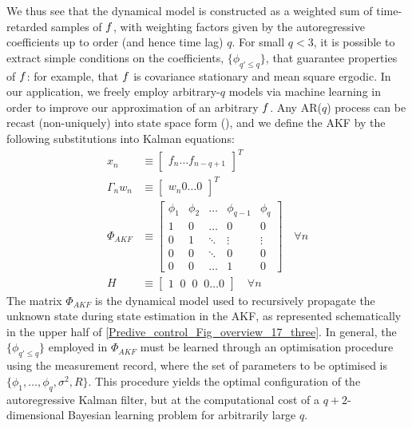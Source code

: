 \noindent We thus see that the dynamical model is constructed as a weighted sum of time-retarded samples of $f$, with weighting factors given by the autoregressive coefficients up to order (and hence time lag) $q$. For small $q < 3$, it is possible to extract simple conditions on the coefficients, $\{ \phi_{q' \leq q} \}$, that guarantee properties of $f$: for example, that $f$ is covariance stationary and mean square ergodic. In our application, we freely employ arbitrary-$q$ models via machine learning in order to improve our approximation of an arbitrary $f$. Any AR($q$) process can be recast (non-uniquely) into state space form (\cite{harvey1990forecasting}), and we define the AKF by the following substitutions into Kalman equations:
\begin{align}
	x_n & \equiv  \begin{bmatrix} f_{n} \hdots f_{n-q+1} \end{bmatrix}^T \\
	\Gamma_n w_n & \equiv \begin{bmatrix} w_{n} 0 \hdots 0 \end{bmatrix}^T \\
	\Phi_{AKF} & \equiv 
	\begin{bmatrix}
		\phi_1 & \phi_2 & \hdots & \phi_{q-1} & \phi_q \\ 
		1 & 0 & \hdots & 0 & 0 \\  
		0 & 1 & \ddots & \vdots & \vdots \\ 
		0 & 0 & \ddots & 0 & 0 \\ 
		0 & 0 & \hdots & 1 & 0 
	\end{bmatrix} \quad \forall n \label{eqn:akf_Phi} \\
	H & \equiv \begin{bmatrix} 1\;\;0\;\;0\;\;0\hdots0 \end{bmatrix} \quad \forall n  
\end{align}
The matrix $\Phi_{AKF}$ is the dynamical model used to recursively propagate the unknown state during state estimation in the AKF, as represented schematically in the upper half of \cref{Predive_control_Fig_overview_17_three}. In general, the $\{\phi_{q' \leq q}\}$ employed in $\Phi_{AKF}$ must be learned through an optimisation procedure using the measurement record, where the set of parameters to be optimised is $\{\phi_1, \hdots, \phi_q, \sigma^2, R \}$. This procedure yields the optimal configuration of the autoregressive Kalman filter, but at the computational cost of a $q+2$-dimensional Bayesian learning problem for arbitrarily large $q$.

